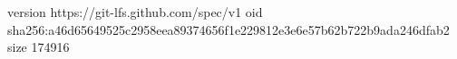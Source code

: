 version https://git-lfs.github.com/spec/v1
oid sha256:a46d65649525c2958eea89374656f1e229812e3e6e57b62b722b9ada246dfab2
size 174916
